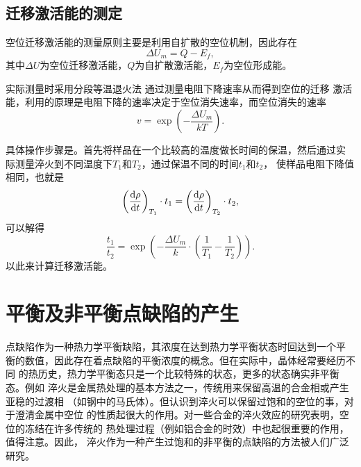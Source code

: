         \subsection{迁移激活能的测定}
            空位迁移激活能的测量原则主要是利用自扩散的空位机制，因此存在
            \begin{equation}
                \Delta U_m=Q-E_f,
            \end{equation}
            其中$\Delta U$为空位迁移激活能，$Q$为自扩散激活能，$E_f$为空位形成能。

            实际测量时采用分段等温退火法 通过测量电阻下降速率从而得到空位的迁移
            激活能，利用的原理是电阻下降的速率决定于空位消失速率，而空位消失的速率
            \begin{equation}
                v=\exp\left(- \frac{\Delta U_m}{kT} \right).
            \end{equation}

            具体操作步骤是。首先将样品在一个比较高的温度做长时间的保温，然后通过实
            际测量淬火到不同温度下$T_1$和$T_2$，通过保温不同的时间$t_1$和$t_2$，
            使样品电阻下降值相同，也就是
            \begin{equation}
                \left( \frac{\mathop{}\!\mathrm{d} \rho}{\mathop{}\!\mathrm{d} t} \right)_{T_1}\cdot t_1=\left( \frac{\mathop{}\!\mathrm{d} \rho}{\mathop{}\!\mathrm{d} t} \right)_{T_2}\cdot t_2,
            \end{equation}
            可以解得
            \begin{equation}
                \frac{t_1}{t_2}=\exp\left( -\frac{\Delta U_m}{k}\cdot\left( \frac{1}{T_1}-\frac{1}{T_2} \right) \right).
            \end{equation}
            以此来计算迁移激活能。
    \section{平衡及非平衡点缺陷的产生}
        点缺陷作为一种热力学平衡缺陷，其浓度在达到热力学平衡状态时回达到一个平
        衡的数值，因此存在着点缺陷的平衡浓度的概念。但在实际中，晶体经常要经历不同
        的热历史，热力学平衡态只是一个比较特殊的状态，更多的状态确实非平衡态。例如
        淬火是金属热处理的基本方法之一，传统用来保留高温的合金相或产生亚稳的过渡相
        （如钢中的马氏体）。但认识到淬火可以保留过饱和的空位的事，对于澄清金属中空位
        的性质起很大的作用。对一些合金的淬火效应的研究表明，空位的冻结在许多传统的
        热处理过程（例如铝合金的时效）中也起很重要的作用，值得注意。因此，
        淬火作为一种产生过饱和的非平衡的点缺陷的方法被人们广泛研究。


